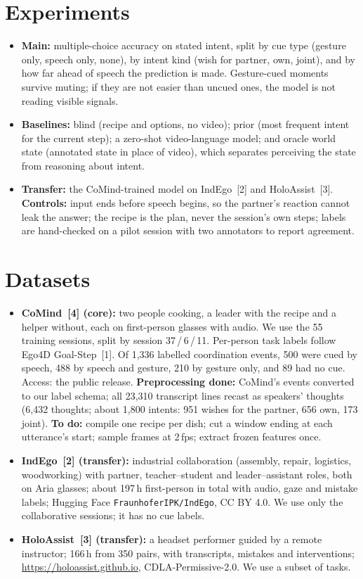 \documentclass[10pt]{article}
\begin{document}
\section{Experiments}
\begin{itemize}
  \item \textbf{Main:} multiple-choice accuracy on stated intent, split by cue type (gesture only, speech only, none), by intent kind (wish for partner, own, joint), and by how far ahead of speech the prediction is made. Gesture-cued moments survive muting; if they are not easier than uncued ones, the model is not reading visible signals.
  \item \textbf{Baselines:} blind (recipe and options, no video); prior (most frequent intent for the current step); a zero-shot video-language model; and oracle world state (annotated state in place of video), which separates perceiving the state from reasoning about intent.
  \item \textbf{Transfer:} the CoMind-trained model on IndEgo~[2] and HoloAssist~[3]. \textbf{Controls:} input ends before speech begins, so the partner's reaction cannot leak the answer; the recipe is the plan, never the session's own steps; labels are hand-checked on a pilot session with two annotators to report agreement.
\end{itemize}

\section{Datasets}
\begin{itemize}
  \item \textbf{CoMind~[4] (core):} two people cooking, a leader with the recipe and a helper without, each on first-person glasses with audio. We use the 55 training sessions, split by session 37\,/\,6\,/\,11. Per-person task labels follow Ego4D Goal-Step~[1]. Of 1,336 labelled coordination events, 500 were cued by speech, 488 by speech and gesture, 210 by gesture only, and 89 had no cue. Access: the public release. \textbf{Preprocessing done:} CoMind's events converted to our label schema; all 23,310 transcript lines recast as speakers' thoughts (6,432 thoughts; about 1,800 intents: 951 wishes for the partner, 656 own, 173 joint). \textbf{To do:} compile one recipe per dish; cut a window ending at each utterance's start; sample frames at 2\,fps; extract frozen features once.
  \item \textbf{IndEgo~[2] (transfer):} industrial collaboration (assembly, repair, logistics, woodworking) with partner, teacher--student and leader--assistant roles, both on Aria glasses; about 197\,h first-person in total with audio, gaze and mistake labels; Hugging Face \texttt{FraunhoferIPK/IndEgo}, CC BY 4.0. We use only the collaborative sessions; it has no cue labels.
  \item \textbf{HoloAssist~[3] (transfer):} a headset performer guided by a remote instructor; 166\,h from 350 pairs, with transcripts, mistakes and interventions; \url{https://holoassist.github.io}, CDLA-Permissive-2.0. We use a subset of tasks.
\end{itemize}
\end{document}
